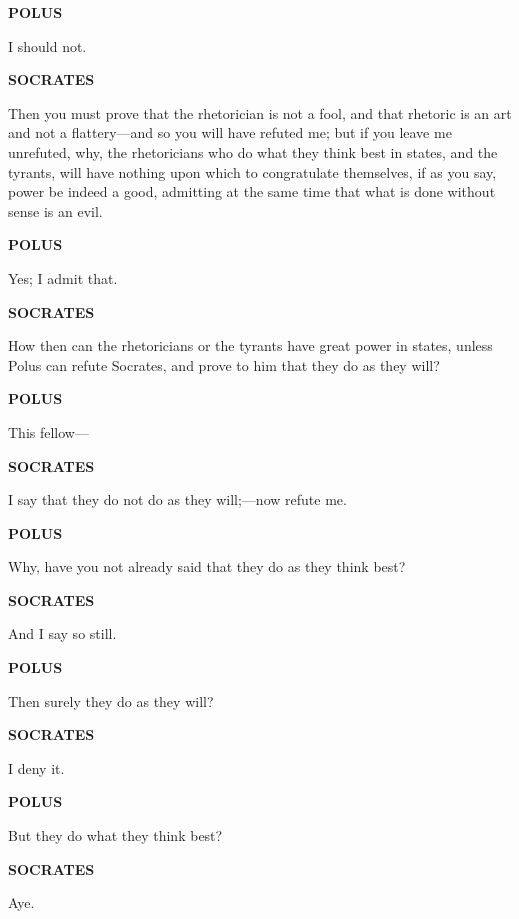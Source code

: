 \documentclass[11pt,letter]{article}
\begin{document}
\par \textbf{POLUS}
\par   I should not.

\par \textbf{SOCRATES}
\par   Then you must prove that the rhetorician is not a fool, and that rhetoric is an art and not a flattery—and so you will have refuted me; but if you leave me unrefuted, why, the rhetoricians who do what they think best in states, and the tyrants, will have nothing upon which to congratulate themselves, if as you say, power be indeed a good, admitting at the same time that what is done without sense is an evil.

\par \textbf{POLUS}
\par   Yes; I admit that.

\par \textbf{SOCRATES}
\par   How then can the rhetoricians or the tyrants have great power in states, unless Polus can refute Socrates, and prove to him that they do as they will?

\par \textbf{POLUS}
\par   This fellow—

\par \textbf{SOCRATES}
\par   I say that they do not do as they will;—now refute me.

\par \textbf{POLUS}
\par   Why, have you not already said that they do as they think best?

\par \textbf{SOCRATES}
\par   And I say so still.

\par \textbf{POLUS}
\par   Then surely they do as they will?

\par \textbf{SOCRATES}
\par   I deny it.

\par \textbf{POLUS}
\par   But they do what they think best?

\par \textbf{SOCRATES}
\par   Aye.
\end{document}
